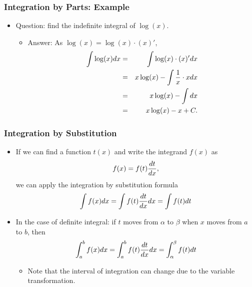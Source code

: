 \documentclass[pdflatex, 12pt]{beamer}
\begin{document}
\begin{frame}
\frametitle{Integration by Parts: Example}
\begin{itemize}
\item Question: find the indefinite integral of $\log(x)$.
\vspace{0.4cm}
 \begin{itemize}
 \item Answer: As $\log(x) = \log(x) \cdot (x)'$,
  \begin{eqnarray}
  \int \log(x) dx &=& \int \log(x) \cdot (x)' dx \notag \\
  &=& x\log(x) - \int \frac{1}{x} \cdot x dx \notag \\
  &=& x\log(x) - \int dx \notag \\
  &=& x\log(x) - x + C. \notag
  \end{eqnarray}
 \end{itemize}
\end{itemize}
\end{frame}

\begin{frame}
\frametitle{Integration by Substitution}
\begin{itemize}
\item If we can find a function $t(x)$ and write the integrand $f(x)$ as 
 \begin{equation}
 f(x) = f(t) \frac{dt}{dx}, \notag
 \end{equation}
we can apply the integration by substitution formula
 \begin{equation}
 \int f(x) dx = \int f(t) \frac{dt}{dx} dx = \int f(t) dt \notag
 \end{equation}
\item In the case of definite integral: if $t$ moves from $\alpha$ to $\beta$ when $x$ moves from $a$ to $b$, then
 \begin{equation}
 \int^b_a f(x) dx = \int^b_a f(t) \frac{dt}{dx} dx = \int^{\beta}_{\alpha} f(t) dt \notag
 \end{equation}
 \begin{itemize}
 \item Note that the interval of integration can change due to the variable transformation.
 \end{itemize}
\end{itemize}
\end{frame}
\end{document}
